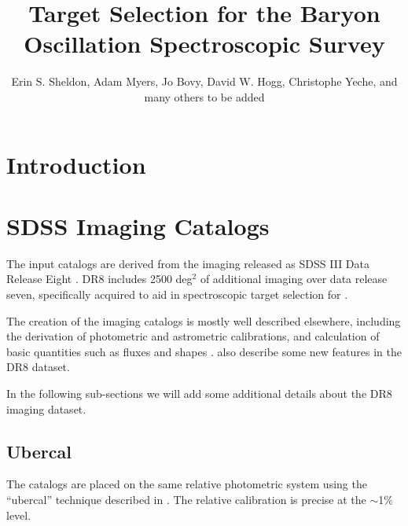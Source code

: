 \documentclass[12pt,preprint]{aastex}
\begin{document}
\title{Target Selection for the Baryon Oscillation Spectroscopic Survey}



\author{
Erin S. Sheldon,
Adam Myers,
Jo Bovy,
David W. Hogg,
Christophe Yeche,
and many others to be added
}


\clearpage
\tableofcontents

\section{Introduction}


\section{SDSS Imaging Catalogs} \label{sec:sdssdata}

The input catalogs are derived from the imaging released as SDSS III Data
Release Eight \citep[SDSS DR8;][]{dr8}.   DR8 includes 2500 deg$^2$ of
additional imaging over data release seven, specifically acquired to aid in
spectroscopic target selection for \boss.

The creation of the imaging catalogs is mostly well described elsewhere,
including the derivation of photometric \citep{Nikhil08,Smith02,Tucker06}
and astrometric \citep{Pier03} calibrations, and calculation of basic
quantities such as fluxes and shapes \citep{LuptonADASS01}.  \citet{dr8}
also describe some new features in the DR8 dataset.

In the following sub-sections we will add some additional details about the
DR8 imaging dataset.

\subsection{Ubercal}

The catalogs are placed on the same relative photometric system using the
``ubercal'' technique described in \citet{Nikhil08}.  The relative calibration
is precise at the $\sim$1\% level.
\end{document}
